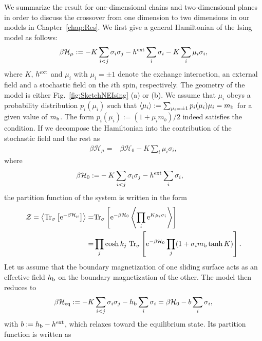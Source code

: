 We summarize the result for one-dimensional chains and two-dimensional planes in order to discuss the crossover from one dimension to two dimensions in our models in Chapter~\ref{chap:Res}. We first give a general Hamiltonian of the Ising model as follows:
\begin{align}
\beta \mathcal{H}_{\mu}:=-K\sum_{i<j}\sigma_{i}\sigma_{j}-h^{\rm ext}\sum_{i}\sigma_{i}-K\sum_{i}\mu_{i}\sigma_{i},
\end{align}
where $K$, $h^{\rm ext}$ and $\mu_{i}$ with $\mu_{i}=\pm 1$ denote the exchange interaction, an external field and a stochastic field on the $i$th spin, respectively. The geometry of the model is either Fig.~\ref{fig:SketchNEIsing} (a) or (b). We assume that $\mu_{i}$ obeys a probability distribution $p_{i}(\mu_{i})$ such that $\langle\mu_{i}\rangle:=\sum_{\mu_{i}=\pm 1}p_{i}(\mu_{i})\mu_{i}=m_{\rm b}$ for a given  value of $m_{\rm b}$. The form $p_{i}(\mu_{i}):=(1+\mu_{i}m_{b})/2$ indeed satisfies the condition. If we decompose the Hamiltonian into the contribution of the stochastic field and the rest as
\begin{align}
\beta \mathcal{H}_{\mu}=&\beta \mathcal{H}_{0} - K\sum_{i}\mu_{i}\sigma_{i},
\end{align}
where
\begin{align}
\beta \mathcal{H}_{0}:=&-K\sum_{i<j}\sigma_{i}\sigma_{j}-h^{\rm ext}\sum_{i}\sigma_{i},
\end{align}
the partition function of the system is written in the form
\begin{align}
\mathcal{Z} = \left\langle\mathrm{Tr}_{\sigma}\left[\mathrm{e}^{-\beta \mathcal{H}_{\mu}}\right]\right\rangle =&\mathrm{Tr}_{\sigma}\left[\mathrm{e}^{-\beta \mathcal{H}_{0}}\left\langle\prod_{i}\mathrm{e}^{K\mu_{i}\sigma_{i}}\right\rangle\right]\\
=&\prod_{j}\cosh k_{j}\;\mathrm{Tr}_{\sigma}\left[\mathrm{e}^{-\beta \mathcal{H}_{0}}\prod_{j}(1+\sigma_{i}m_{\rm b}\tanh K)\right].\label{eq:Z}
\end{align}
Let us assume that the boundary magnetization of one sliding surface acts as an effective field $h_{\rm b}$ on the boundary magnetization of the other.  The model then reduces to
\begin{align}
\beta\mathcal{H}_{\rm eq}:=-K\sum_{i<j}\sigma_{i}\sigma_{j}-h_{\rm b}\sum_{i}\sigma_{i}=\beta\mathcal{H}_{0} - b\sum_{i}\sigma_{i},
\end{align}
with $b:=h_{\rm b}-h^{\rm ext}$, which relaxes toward the equilibrium state. Its partition function is written as
